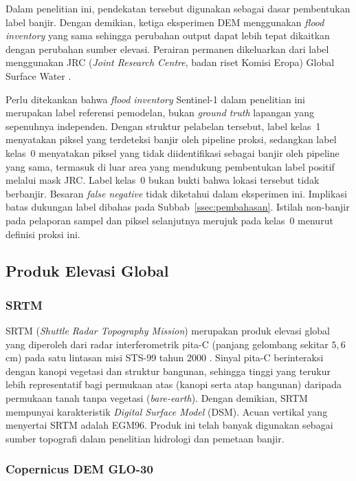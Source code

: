 \documentclass[12pt]{article}
\begin{document}
Dalam penelitian ini, pendekatan tersebut digunakan sebagai dasar pembentukan
label banjir. Dengan demikian, ketiga eksperimen DEM menggunakan
\textit{flood inventory} yang sama sehingga perubahan output dapat lebih
tepat dikaitkan dengan perubahan sumber elevasi. Perairan permanen
dikeluarkan dari label menggunakan JRC (\textit{Joint Research Centre},
badan riset Komisi Eropa) Global Surface Water \cite{pekel2016}.

Perlu ditekankan bahwa \textit{flood inventory} Sentinel-1 dalam penelitian
ini merupakan label referensi pemodelan, bukan \textit{ground truth}
lapangan yang sepenuhnya independen. Dengan struktur pelabelan tersebut,
label kelas~1 menyatakan piksel yang terdeteksi banjir oleh pipeline
proksi, sedangkan label kelas~0 menyatakan piksel yang tidak diidentifikasi
sebagai banjir oleh pipeline yang sama, termasuk di luar area yang
mendukung pembentukan label positif melalui mask JRC. Label kelas~0 bukan
bukti bahwa lokasi tersebut tidak berbanjir. Besaran \textit{false negative}
tidak diketahui dalam eksperimen ini. Implikasi batas dukungan label
dibahas pada Subbab~\ref{ssec:pembahasan}. Istilah non-banjir pada
pelaporan sampel dan piksel selanjutnya merujuk pada kelas~0 menurut
definisi proksi ini.

\subsection{Produk Elevasi Global}

\subsubsection{SRTM}

SRTM (\textit{Shuttle Radar Topography Mission}) merupakan produk elevasi
global yang diperoleh dari radar interferometrik pita-C (panjang gelombang
sekitar $5{,}6$ cm) pada satu lintasan misi STS-99 tahun 2000
\cite{farr2007}. Sinyal pita-C berinteraksi dengan kanopi vegetasi dan
struktur bangunan, sehingga tinggi yang terukur lebih representatif bagi
permukaan atas (kanopi serta atap bangunan) daripada permukaan tanah tanpa
vegetasi (\textit{bare-earth}). Dengan demikian, SRTM mempunyai
karakteristik \textit{Digital Surface Model} (DSM).
Acuan vertikal yang menyertai SRTM adalah EGM96. Produk ini telah banyak
digunakan sebagai sumber topografi dalam penelitian
hidrologi dan pemetaan banjir.

\subsubsection{Copernicus DEM GLO-30}
\end{document}
